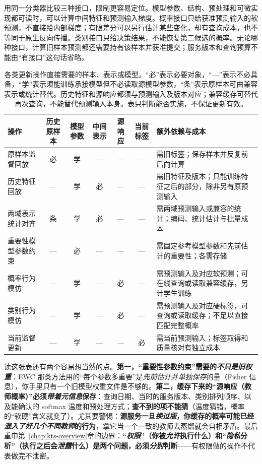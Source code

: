 用同一分类器比较三种接口，限制更容易定位。模型参数、结构、预处理和可微实现都可读时，可以计算中间特征和预测输入梯度。概率接口只给获准预测输入的软预测，不直接给内部梯度；有限差分可以另行估计某些变化，却有查询成本，也不等同于原生反向传播。类别接口只给决策结果，不能恢复第二候选的概率。无论哪种接口，计算旧样本预测都还需要持有该样本并获准提交；服务版本和查询预算不能由“有接口”这句话省略。

\begin{table}[htbp]
\small
\begin{tabularx}{\linewidth}{@{}p{26mm}cccccX@{}}
\toprule
操作 & 历史原样本 & 模型参数 & 中间表示 & 源响应 & 当前标签 & 额外依赖与成本 \\
\midrule
原样本监督回放 & 必 & 学 & — & — & — & 需旧标签；保存样本并反复前后向计算 \\
历史特征回放 & — & 学 & 必 & — & — & 需旧特征及版本；只能训练特征之后的部分，除非另有原预测输入 \\
两域表示统计对齐 & 条 & 学 & 必 & — & — & 需两域预测输入或兼容的统计；编码、统计估计与批量成本 \\
重要性模型参数约束 & — & 必 & — & — & — & 需固定参考模型参数和先前估计的重要性；各需存储 \\
概率行为模仿 & — & 学 & — & 必 & — & 需预测输入及对应软预测；可在线查询或读取兼容缓存，另计学生训练 \\
类别行为模仿 & — & 学 & — & 必 & — & 需预测输入及对应硬标签，可查询或读取缓存；不足以直接匹配完整概率 \\
当前监督更新 & — & 学 & — & — & 必 & 需当前预测输入；标签取得和质量核对有独立成本 \\
\bottomrule
\end{tabularx}
\caption{各类更新操作直接需要的样本、表示或模型。“必”表示必要对象，“—”表示不必具备，“学”表示须能训练承接模型但不必读取源模型参数，“条”表示原样本可由兼容表示或统计替代。历史特征和源响应都须与预测输入及版本对应；兼容缓存可替代再次查询，不能替代预测输入本身。表只判断能否实施，不保证更新有效。}
\label{tab:ket-update-access}
\end{table}

读这张表还有两个容易想当然的点。\textbf{第一，“重要性参数约束”需要的\emph{不只是旧权重}}：EWC 那类方法用的“每个参数多重要”是\emph{先前\emph{估计并单独保存}}的量（Fisher 信息），你手里只有一个旧模型权重文件是不够的。\textbf{第二，缓存下来的“源响应（教师概率）”必须\emph{带着元信息}保存}：查询日期、当时的服务版本、类别排列顺序、以及能确认的 softmax 温度和预处理方式；\textbf{查不到的项不能猜}（温度猜错，概率的“软硬”含义就变了）。尤其要警惕：\textbf{源服务一旦\emph{换过版}，你缓存的概率可能已经\emph{混入了好几个不同教师}的行为}，拿它当一个一致的教师去蒸馏就会自相矛盾。最后重申第~\ref{chap:kts-overview}章的边界：\textbf{“\emph{权限}”（你被\emph{允许}执行什么）和“\emph{隐私}分析”（执行之后会\emph{泄露}什么）是两个问题，必须\emph{分别}判断}——有权限做的操作不代表做完不泄密。

